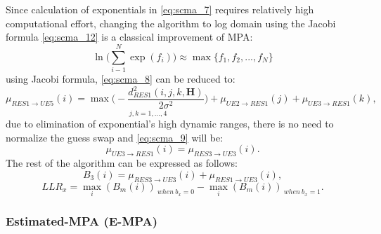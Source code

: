 Since calculation of exponentials in \eqref{eq:scma_7} requires relatively high
computational effort, changing the algorithm to log domain using the Jacobi
formula \eqref{eq:scma_12} is a classical improvement of MPA:
\begin{equation}
  \label{eq:scma_12}
  \ln \Bigg( \sum\limits_{i-1}^N\exp(f_i) \Bigg) \approx \max\{f_1,f_2,...,f_N\}
\end{equation}
using Jacobi formula, \eqref{eq:scma_8} can be reduced to:
\begin{equation}
  \label{eq:scma_13}
  \mu_{RES1 \rightarrow UE5}(i) = \underset{j,k=1,...,4}
  {\max \Bigg(-\frac{d_{RES1}^2(i,j,k,\bm{H})}{2\sigma^2} \Bigg)} +
  \mu_{UE2 \rightarrow RES1}(j) + \mu_{UE3 \rightarrow RES1}(k),
\end{equation}
due to elimination of exponential's high dynamic ranges, there is no need to
normalize the guess swap and \eqref{eq:scma_9} will be:
\begin{equation}
  \label{eq:scma_14}
  \mu_{UE3 \rightarrow RES1}(i) = \mu_{RES3 \rightarrow UE3}(i).
\end{equation}
The rest of the algorithm can be expressed as follows:
\begin{equation}
  \label{eq:scma_15}
  B_3(i) = \mu_{RES3 \rightarrow UE3}(i) + \mu_{RES1 \rightarrow UE3}(i),
\end{equation}
\begin{equation}
  \label{eq:scma_16}
  LLR_x = \max_i(B_m(i))_{~when~b_x=0} - \max_i(B_m(i))_{~when~b_x=1}.
\end{equation}

\subsubsection{Estimated-MPA (E-MPA)}

